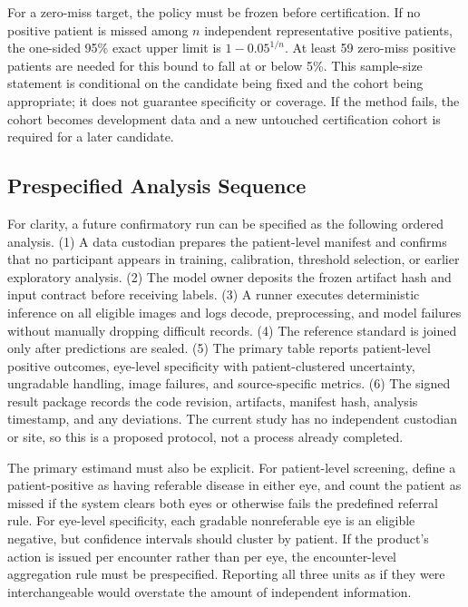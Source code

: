 \documentclass{ieeeaccess}
\begin{document}
For a zero-miss target, the policy must be frozen before certification. If no positive patient is missed among $n$ independent representative positive patients, the one-sided 95\% exact upper limit is $1-0.05^{1/n}$. At least 59 zero-miss positive patients are needed for this bound to fall at or below 5\%. This sample-size statement is conditional on the candidate being fixed and the cohort being appropriate; it does not guarantee specificity or coverage. If the method fails, the cohort becomes development data and a new untouched certification cohort is required for a later candidate.

\subsection{Prespecified Analysis Sequence}
For clarity, a future confirmatory run can be specified as the following ordered analysis. (1) A data custodian prepares the patient-level manifest and confirms that no participant appears in training, calibration, threshold selection, or earlier exploratory analysis. (2) The model owner deposits the frozen artifact hash and input contract before receiving labels. (3) A runner executes deterministic inference on all eligible images and logs decode, preprocessing, and model failures without manually dropping difficult records. (4) The reference standard is joined only after predictions are sealed. (5) The primary table reports patient-level positive outcomes, eye-level specificity with patient-clustered uncertainty, ungradable handling, image failures, and source-specific metrics. (6) The signed result package records the code revision, artifacts, manifest hash, analysis timestamp, and any deviations. The current study has no independent custodian or site, so this is a proposed protocol, not a process already completed.

The primary estimand must also be explicit. For patient-level screening, define a patient-positive as having referable disease in either eye, and count the patient as missed if the system clears both eyes or otherwise fails the predefined referral rule. For eye-level specificity, each gradable nonreferable eye is an eligible negative, but confidence intervals should cluster by patient. If the product's action is issued per encounter rather than per eye, the encounter-level aggregation rule must be prespecified. Reporting all three units as if they were interchangeable would overstate the amount of independent information.
\end{document}
